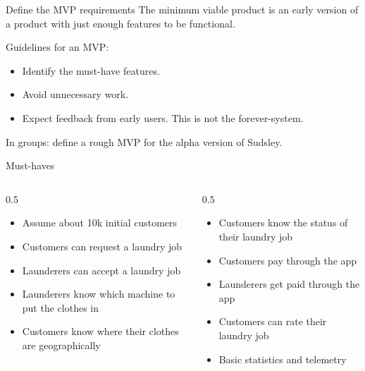 \documentclass[aspectratio=169]{beamer}
\begin{document}
\begin{frame}{Define the MVP requirements}
  The \alert{minimum viable product} is an early version of a product with just enough
  features to be functional.

  \medskip
  Guidelines for an MVP:
  \begin{itemize}
    \item Identify the must-have features.
    \item Avoid unnecessary work.
    \item Expect feedback from early users. This is not the forever-system.
  \end{itemize}

  \medskip
  \alert{In groups:} define a rough MVP for the alpha version of Sudsley.
\end{frame}

\begin{frame}{Must-haves}
  \begin{columns}[T]
    \begin{column}{0.5\textwidth}
      \small
      \begin{itemize}
        \item Assume about 10k initial customers
        \item Customers can request a laundry job
        \item Launderers can accept a laundry job
        \item Launderers know which machine to put the clothes in
        \item Customers know where their clothes are geographically
      \end{itemize}
    \end{column}
    \begin{column}{0.5\textwidth}
      \small
      \begin{itemize}
        \item Customers know the status of their laundry job
        \item Customers pay through the app
        \item Launderers get paid through the app
        \item Customers can rate their laundry job
        \item Basic statistics and telemetry
      \end{itemize}
    \end{column}
  \end{columns}
\end{frame}
\end{document}
